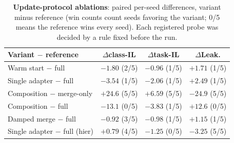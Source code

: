 \documentclass{article}
\begin{document}
\begin{table}[t]
\centering\footnotesize
\caption{\textbf{Update-protocol ablations}: paired per-seed differences, variant minus reference (win counts count seeds favoring the variant; 0/5 means the reference wins every seed). Each registered probe was decided by a rule fixed before the run.}
\label{tab:abl}
\begin{tabular}{lccc}
\toprule
Variant $-$ reference & $\Delta$class-IL & $\Delta$task-IL & $\Delta$Leak. \\
\midrule
Warm start $-$ full & $-1.80$ (2/5) & $-0.96$ (1/5) & $+1.71$ (1/5) \\
Single adapter $-$ full & $-3.54$ (1/5) & $-2.06$ (1/5) & $+2.49$ (1/5) \\
Composition $-$ merge-only & $+24.6$ (5/5) & $+6.59$ (5/5) & $-24.9$ (5/5) \\
Composition $-$ full & $-13.1$ (0/5) & $-3.83$ (1/5) & $+12.6$ (0/5) \\
Damped merge $-$ full & $-0.92$ (3/5) & $-0.98$ (1/5) & $+1.15$ (1/5) \\
Single adapter $-$ full (hier) & $+0.79$ (4/5) & $-1.25$ (0/5) & $-3.25$ (5/5) \\
\bottomrule
\end{tabular}
\end{table}
\end{document}
